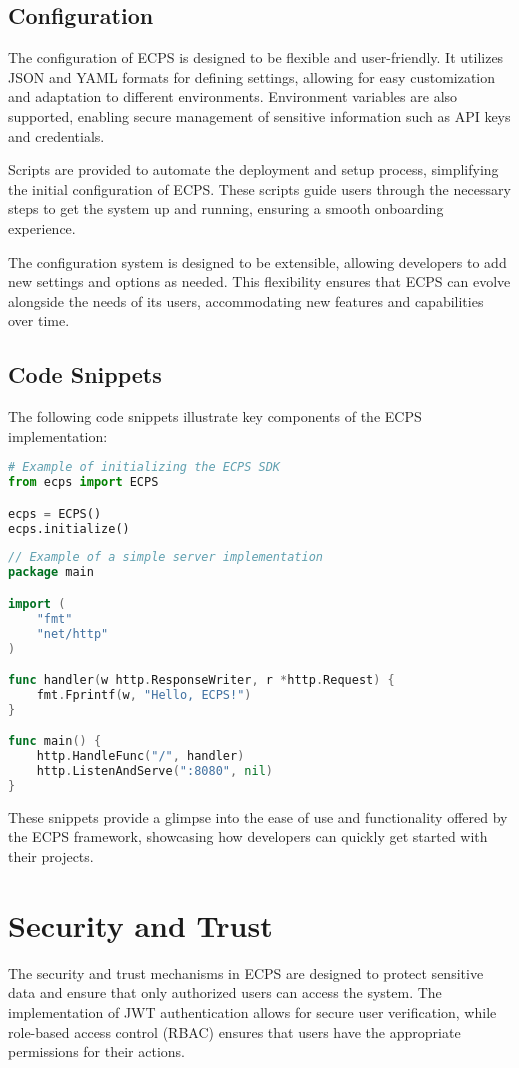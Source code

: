\documentclass[12pt]{article}
\begin{document}
\subsection{Configuration}
The configuration of ECPS is designed to be flexible and user-friendly. It utilizes JSON and YAML formats for defining settings, allowing for easy customization and adaptation to different environments. Environment variables are also supported, enabling secure management of sensitive information such as API keys and credentials.

Scripts are provided to automate the deployment and setup process, simplifying the initial configuration of ECPS. These scripts guide users through the necessary steps to get the system up and running, ensuring a smooth onboarding experience.

The configuration system is designed to be extensible, allowing developers to add new settings and options as needed. This flexibility ensures that ECPS can evolve alongside the needs of its users, accommodating new features and capabilities over time.

\subsection{Code Snippets}
The following code snippets illustrate key components of the ECPS implementation:

\begin{lstlisting}[language=Python]
# Example of initializing the ECPS SDK
from ecps import ECPS

ecps = ECPS()
ecps.initialize()
\end{lstlisting}

\begin{lstlisting}[language=Go]
// Example of a simple server implementation
package main

import (
    "fmt"
    "net/http"
)

func handler(w http.ResponseWriter, r *http.Request) {
    fmt.Fprintf(w, "Hello, ECPS!")
}

func main() {
    http.HandleFunc("/", handler)
    http.ListenAndServe(":8080", nil)
}
\end{lstlisting}

These snippets provide a glimpse into the ease of use and functionality offered by the ECPS framework, showcasing how developers can quickly get started with their projects.

\section{Security and Trust}
The security and trust mechanisms in ECPS are designed to protect sensitive data and ensure that only authorized users can access the system. The implementation of JWT authentication allows for secure user verification, while role-based access control (RBAC) ensures that users have the appropriate permissions for their actions.
\end{document}
